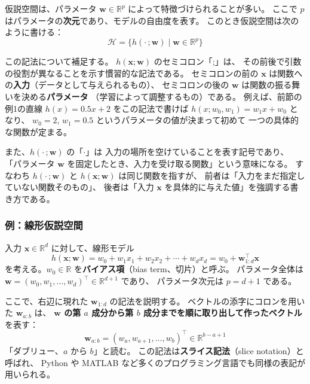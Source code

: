 仮説空間は、パラメータ $\bm{w} \in \mathbb{R}^p$ によって特徴づけられることが多い。
ここで $p$ はパラメータの\textbf{次元}であり、モデルの自由度を表す。
このとき仮説空間は次のように書ける：
\begin{equation}
  \mathcal{H} = \{ h(\cdot\,; \bm{w}) \mid \bm{w} \in \mathbb{R}^p \}
\end{equation}

この記法について補足する。
$h(\bm{x}; \bm{w})$ のセミコロン「;」は、
その前後で引数の役割が異なることを示す慣習的な記法である。
セミコロンの前の $\bm{x}$ は関数への\textbf{入力}（データとして与えられるもの）、
セミコロンの後の $\bm{w}$ は関数の振る舞いを決める\textbf{パラメータ}
（学習によって調整するもの）である。
例えば、前節の例1の直線 $h(x) = 0.5x + 2$ をこの記法で書けば
$h(x; w_0, w_1) = w_1 x + w_0$ となり、
$w_0 = 2$, $w_1 = 0.5$ というパラメータの値が決まって初めて
一つの具体的な関数が定まる。

また、$h(\cdot\,; \bm{w})$ の「$\cdot$」は
入力の場所を空けていることを表す記号であり、
「パラメータ $\bm{w}$ を固定したとき、入力を受け取る関数」という意味になる。
すなわち $h(\cdot\,; \bm{w})$ と $h(\bm{x}; \bm{w})$ は同じ関数を指すが、
前者は「入力をまだ指定していない関数そのもの」、
後者は「入力 $\bm{x}$ を具体的に与えた値」を強調する書き方である。

\subsubsection{例：線形仮説空間}

入力 $\bm{x} \in \mathbb{R}^d$ に対して、線形モデル
\begin{equation}
  h(\bm{x}; \bm{w}) = w_0 + w_1 x_1 + w_2 x_2 + \cdots + w_d x_d
  = w_0 + \bm{w}_{1:d}^\top \bm{x}
\end{equation}
を考える。$w_0 \in \mathbb{R}$ を\textbf{バイアス項}（bias term、切片）と呼ぶ。
パラメータ全体は $\bm{w} = (w_0, w_1, \ldots, w_d)^\top \in \mathbb{R}^{d+1}$ であり、
パラメータ次元は $p = d + 1$ である。

ここで、右辺に現れた $\bm{w}_{1:d}$ の記法を説明する。
ベクトルの添字にコロンを用いた $\bm{w}_{a:b}$ は、
\textbf{$\bm{w}$ の第 $a$ 成分から第 $b$ 成分までを順に取り出して作ったベクトル}を表す：
\begin{equation}
  \bm{w}_{a:b} = (w_a, w_{a+1}, \ldots, w_b)^\top \in \mathbb{R}^{b-a+1}
\end{equation}
「ダブリュー、$a$ から $b$」と読む。
この記法は\textbf{スライス記法}（slice notation）と呼ばれ、
Python や MATLAB など多くのプログラミング言語でも同様の表記が用いられる。

